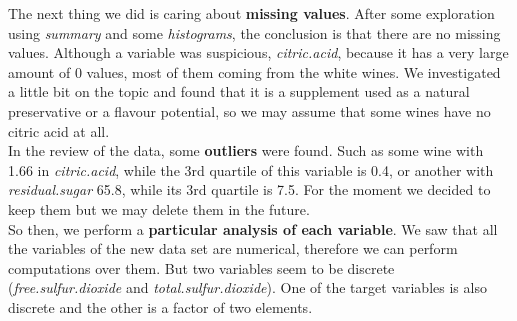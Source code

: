 \documentclass[10pt]{article}
\begin{document}
The next thing we did is caring about \textbf{missing values}. After some exploration using \textit{summary} and some \textit{histograms}, the conclusion is that there are no missing values. Although a variable was suspicious, \textit{citric.acid}, because it has a very large amount of 0 values, most of them coming from the white wines. We investigated a little bit on the topic and found that it is a supplement used as a natural preservative or a flavour potential, so we may assume that some wines have no citric acid at all. \\

In the review of the data, some \textbf{outliers} were found. Such as some wine with 1.66 in \textit{citric.acid}, while the 3rd quartile of this variable is 0.4, or another with \textit{residual.sugar} 65.8, while its 3rd quartile is 7.5. For the moment we decided to keep them but we may delete them in the future. \\

So then, we perform a \textbf{particular analysis of each variable}. We saw that all the variables of the new data set are numerical, therefore we can perform computations over them. But two variables seem to be discrete (\textit{free.sulfur.dioxide} and \textit{total.sulfur.dioxide}). One of the target variables is also discrete and the other is a factor of two elements.\\
\end{document}
